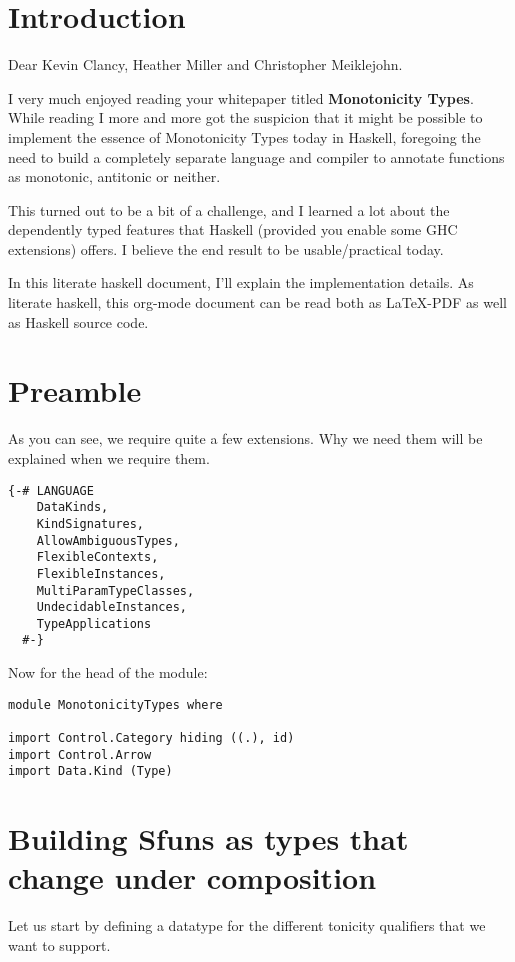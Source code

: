 \documentclass[11pt]{article}
\author{Wiebe-Marten Wijnja}
\date{\today}
\title{}
\begin{document}
\tableofcontents


\section{Introduction}
\label{sec:org3a8cf0e}

Dear Kevin Clancy, Heather Miller and Christopher Meiklejohn.

I very much enjoyed reading your whitepaper titled \textbf{Monotonicity Types}.
While reading I more and more got the suspicion that it might be possible to implement the essence of Monotonicity Types today in Haskell,
foregoing the need to build a completely separate language and compiler to annotate functions as monotonic, antitonic or neither.

This turned out to be a bit of a challenge, and I learned a lot about the dependently typed features that Haskell (provided you enable some GHC extensions) offers.
I believe the end result to be usable/practical today.

In this literate haskell document, I'll explain the implementation details.
As literate haskell, this org-mode document can be read both as \LaTeX{}-PDF as well as Haskell source code.


\section{Preamble}
\label{sec:orgd8b400a}
As you can see, we require quite a few extensions. Why we need them will be explained when we require them.
\begin{verbatim}
{-# LANGUAGE
    DataKinds,
    KindSignatures,
    AllowAmbiguousTypes,
    FlexibleContexts,
    FlexibleInstances,
    MultiParamTypeClasses,
    UndecidableInstances,
    TypeApplications
  #-}

\end{verbatim}

Now for the head of the module:

\begin{verbatim}
module MonotonicityTypes where

import Control.Category hiding ((.), id)
import Control.Arrow
import Data.Kind (Type)
\end{verbatim}

\section{Building Sfuns as types that change under composition}
\label{sec:orge15968d}
Let us start by defining a datatype for the different tonicity qualifiers that we want to support.
\end{document}
